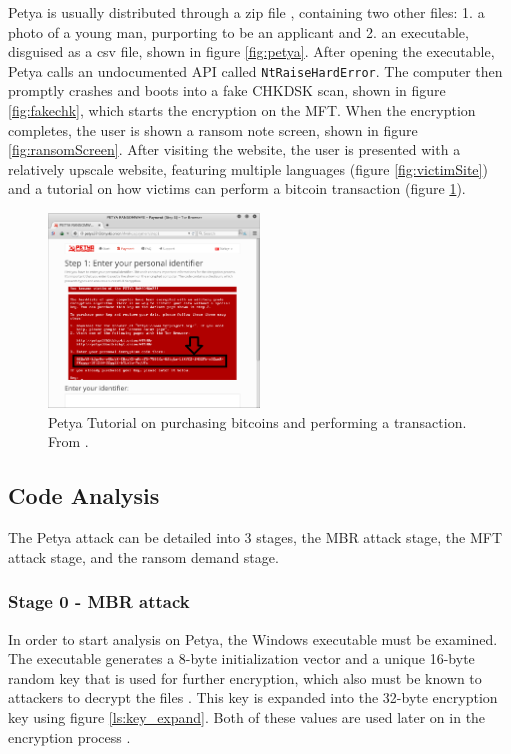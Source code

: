 \documentclass[twocolumn]{article}
\newcommand{\code}[1]{\texttt{#1}}
\begin{document}
Petya is usually distributed through a zip file \cite{lowLevelPetya}, containing two other files: 1. a photo of a young man, purporting to be an applicant and 2. an executable, disguised as a csv file, shown in figure \ref{fig:petya}. 
After opening the executable, Petya calls an undocumented API called \code{NtRaiseHardError}. The computer then promptly crashes and boots into a fake CHKDSK scan, shown in figure \ref{fig:fakechk}, which starts the encryption on the MFT. When the encryption completes, the user is shown a ransom note screen, shown in figure \ref{fig:ransomScreen}. After visiting the website, the user is presented with a relatively upscale website, featuring multiple languages (figure \ref{fig:victimSite}) and a tutorial on how victims can perform a bitcoin transaction (figure \ref{fig:victimTutorial}). 

\begin{figure}
	\includegraphics[width = 0.5\textwidth]{victimTutorial.png}
	\caption{Petya Tutorial on purchasing bitcoins and performing a transaction. From \cite{lowLevelPetya}.}
	\label{fig:victimTutorial}
\end{figure}

\subsection{Code Analysis}
The Petya attack can be detailed into 3 stages, the MBR attack stage, the MFT attack stage, and the ransom demand stage.

\subsubsection{Stage 0 - MBR attack}
\label{sec:stage0}
In order to start analysis on Petya, the Windows executable must be examined. The executable generates a 8-byte initialization vector and a unique 16-byte random key that is used for further encryption, which also must be known to attackers to decrypt the files \cite{lowLevelPetya}. This key is expanded into the 32-byte encryption key using figure \ref{ls:key_expand}. Both of these values are used later on in the encryption process \cite{decryptPetya}. 
\end{document}
